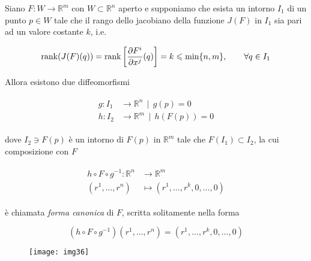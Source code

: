 \begin{theorem}
	Siano $ F : W \to \mathbb{R}^{m} $ con $ W \subset \mathbb{R}^{n} $ aperto e supponiamo che esista un intorno $ I_{1} $ di un punto $ p \in W $ tale che il rango dello jacobiano della funzione $ J(F) $ in $ I_{1} $ sia pari ad un valore costante $ k $, i.e.
	
	\begin{equation}
		\rank(J(F)(q)) = \rank \left[ \dfrac{\partial F^{i}}{\partial x^{j}} (q) \right] = k \leqslant \min\{n,m\}, \qquad \forall q \in I_{1}
	\end{equation}

	Allora esistono due diffeomorfismi
	
	\begin{align}
		\begin{split}
			g : I_{1} &\to \mathbb{R}^{n} \, \mid \, g(p)=0\\
			h : I_{2} &\to \mathbb{R}^{m} \, \mid \, h(F(p))=0
		\end{split}
	\end{align}
	
	dove $ I_{2} \ni F(p) $ è un intorno di $ F(p) $ in $ \mathbb{R}^{m} $ tale che $ F(I_{1}) \subset I_{2} $, la cui composizione con $ F $
	
	\begin{align}
		\begin{split}
			h \circ F \circ g^{-1} : \mathbb{R}^{n} &\to \mathbb{R}^{m}\\
			(r^{1},\dots,r^{n}) &\mapsto (r^{1},\dots,r^{k},0,\dots,0)
		\end{split}
	\end{align}

	è chiamata \textit{forma canonica} di $ F $, scritta solitamente nella forma
	
	\begin{equation}
		(h \circ F \circ g^{-1})(r^{1},\dots,r^{n}) = (r^{1},\dots,r^{k},0,\dots,0)
	\end{equation}

	\begin{figure}[H]
		\centering
		\texttt{[image: img36]}
	\end{figure}
\end{theorem}

